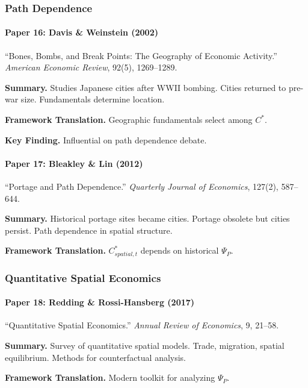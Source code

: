 \subsubsection{Path Dependence}

\paragraph{Paper 16: Davis \& Weinstein (2002)}

``Bones, Bombs, and Break Points: The Geography of Economic Activity.''
\textit{American Economic Review}, 92(5), 1269--1289.

\textbf{Summary.}
Studies Japanese cities after WWII bombing. Cities returned to 
pre-war size. Fundamentals determine location.

\textbf{Framework Translation.}
Geographic fundamentals select among $C^*$.

\textbf{Key Finding.}
Influential on path dependence debate.

\paragraph{Paper 17: Bleakley \& Lin (2012)}

``Portage and Path Dependence.''
\textit{Quarterly Journal of Economics}, 127(2), 587--644.

\textbf{Summary.}
Historical portage sites became cities. Portage obsolete but cities 
persist. Path dependence in spatial structure.

\textbf{Framework Translation.}
$C^*_{spatial,t}$ depends on historical $\Psi_P$.

\subsubsection{Quantitative Spatial Economics}

\paragraph{Paper 18: Redding \& Rossi-Hansberg (2017)}

``Quantitative Spatial Economics.''
\textit{Annual Review of Economics}, 9, 21--58.

\textbf{Summary.}
Survey of quantitative spatial models. Trade, migration, spatial 
equilibrium. Methods for counterfactual analysis.

\textbf{Framework Translation.}
Modern toolkit for analyzing $\Psi_P$.

